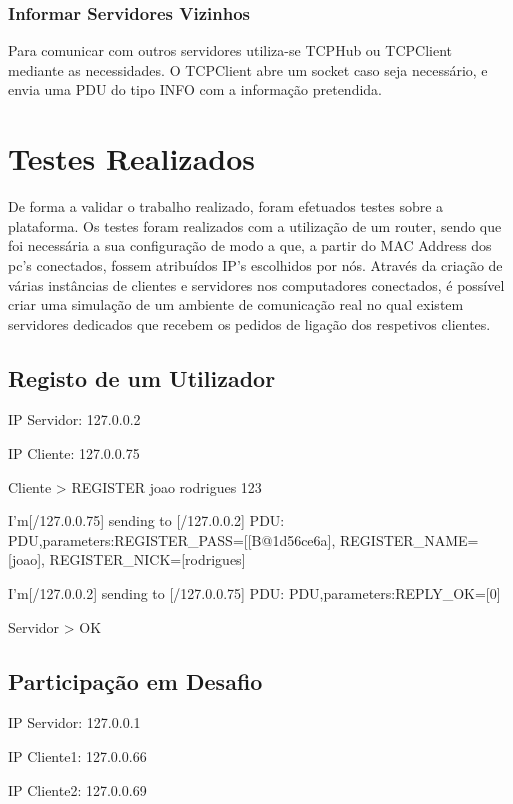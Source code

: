 \documentclass[runningheads,a4paper]{llncs}
\begin{document}
\subsubsection{Informar Servidores Vizinhos}

Para comunicar com outros servidores utiliza-se TCPHub ou TCPClient mediante as necessidades.
O TCPClient abre um socket caso seja necessário, e envia uma PDU do tipo INFO com a informação pretendida.

\section{Testes Realizados}

De forma a validar o trabalho realizado, foram efetuados testes sobre a plataforma. Os testes foram realizados com a utilização de um router, sendo que foi necessária a sua configuração de modo a que, a partir do MAC Address dos pc’s conectados, fossem atribuídos IP’s escolhidos por nós. Através da criação de várias instâncias de clientes e servidores nos computadores conectados, é possível criar uma simulação de um ambiente de comunicação real no qual existem servidores dedicados que recebem os pedidos de ligação dos respetivos clientes.

\subsection{Registo de um Utilizador}

\begin{itemsize}

\item IP Servidor: 127.0.0.2
\item IP Cliente: 127.0.0.75

\end{itemsize}

Cliente > REGISTER joao rodrigues 123

I'm[/127.0.0.75] sending to [/127.0.0.2] PDU: PDU,parameters:{REGISTER_PASS=[[B@1d56ce6a], REGISTER_NAME=[joao], REGISTER_NICK=[rodrigues]}

I'm[/127.0.0.2] sending to [/127.0.0.75] PDU: PDU,parameters:{REPLY_OK=[0]}

Servidor > OK

\subsection{Participação em Desafio}

\begin{itemsize}

\item IP Servidor: 127.0.0.1
\item IP Cliente1: 127.0.0.66
\item IP Cliente2: 127.0.0.69

\end{itemsize}
\end{document}
